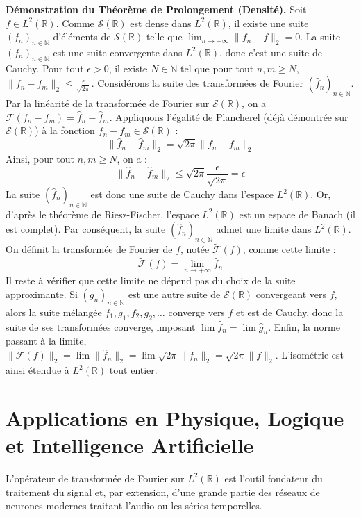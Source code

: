 \documentclass[11pt,a4paper]{article}
\begin{document}
\textbf{Démonstration du Théorème de Prolongement (Densité).}
Soit $f \in L^2(\mathbb{R})$.
Comme $\mathcal{S}(\mathbb{R})$ est dense dans $L^2(\mathbb{R})$, il existe une suite $(f_n)_{n \in \mathbb{N}}$ d'éléments de $\mathcal{S}(\mathbb{R})$ telle que $\lim_{n \to +\infty} \|f_n - f\|_2 = 0$.
La suite $(f_n)_{n \in \mathbb{N}}$ est une suite convergente dans $L^2(\mathbb{R})$, donc c'est une suite de Cauchy.
Pour tout $\epsilon > 0$, il existe $N \in \mathbb{N}$ tel que pour tout $n, m \ge N$, $\|f_n - f_m\|_2 \le \frac{\epsilon}{\sqrt{2\pi}}$.
Considérons la suite des transformées de Fourier $(\hat{f}_n)_{n \in \mathbb{N}}$.
Par la linéarité de la transformée de Fourier sur $\mathcal{S}(\mathbb{R})$, on a $\mathcal{F}(f_n - f_m) = \hat{f}_n - \hat{f}_m$.
Appliquons l'égalité de Plancherel (déjà démontrée sur $\mathcal{S}(\mathbb{R})$) à la fonction $f_n - f_m \in \mathcal{S}(\mathbb{R})$ :
$$ \|\hat{f}_n - \hat{f}_m\|_2 = \sqrt{2\pi} \|f_n - f_m\|_2 $$
Ainsi, pour tout $n, m \ge N$, on a :
$$ \|\hat{f}_n - \hat{f}_m\|_2 \le \sqrt{2\pi} \frac{\epsilon}{\sqrt{2\pi}} = \epsilon $$
La suite $(\hat{f}_n)_{n \in \mathbb{N}}$ est donc une suite de Cauchy dans l'espace $L^2(\mathbb{R})$.
Or, d'après le théorème de Riesz-Fischer, l'espace $L^2(\mathbb{R})$ est un espace de Banach (il est complet).
Par conséquent, la suite $(\hat{f}_n)_{n \in \mathbb{N}}$ admet une limite dans $L^2(\mathbb{R})$. On définit la transformée de Fourier de $f$, notée $\widetilde{\mathcal{F}}(f)$, comme cette limite :
$$ \widetilde{\mathcal{F}}(f) = \lim_{n \to +\infty} \hat{f}_n $$
Il reste à vérifier que cette limite ne dépend pas du choix de la suite approximante. Si $(g_n)_{n \in \mathbb{N}}$ est une autre suite de $\mathcal{S}(\mathbb{R})$ convergeant vers $f$, alors la suite mélangée $f_1, g_1, f_2, g_2, \dots$ converge vers $f$ et est de Cauchy, donc la suite de ses transformées converge, imposant $\lim \hat{f}_n = \lim \hat{g}_n$.
Enfin, la norme passant à la limite, $\|\widetilde{\mathcal{F}}(f)\|_2 = \lim \|\hat{f}_n\|_2 = \lim \sqrt{2\pi}\|f_n\|_2 = \sqrt{2\pi}\|f\|_2$. L'isométrie est ainsi étendue à $L^2(\mathbb{R})$ tout entier.

\section{Applications en Physique, Logique et Intelligence Artificielle}

L'opérateur de transformée de Fourier sur $L^2(\mathbb{R})$ est l'outil fondateur du traitement du signal et, par extension, d'une grande partie des réseaux de neurones modernes traitant l'audio ou les séries temporelles.
\end{document}
